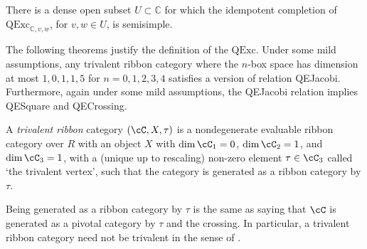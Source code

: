 \documentclass[12pt]{amsart}
\begin{document}
\begin{conjecture}
There is a dense open subset $U \subset \mathbb{C}$ for which the idempotent completion of $\mathrm{QExc}_{\mathbb{C},v,w}$, for $v,w \in U$, is semisimple.
\end{conjecture}



The following theorems justify the definition of the $\mathrm{QExc}$.  Under some mild assumptions, any trivalent ribbon category where the $n$-box space has dimension at most $1,0,1,1,5$ for $n=0,1,2,3,4$ satisfies a version of relation QEJacobi.  Furthermore, again under some mild assumptions, the QEJacobi relation implies QESquare and QECrossing.

\begin{definition}
A \emph{trivalent ribbon} category $(\cC, X, \tau)$ is a nondegenerate evaluable ribbon category over $R$ with 
an object $X$ with $\dim \cC_1 = 0$, $\dim{\cC_2} = 1$, and $\dim{\cC_3} = 1$, with a (unique up to rescaling) non-zero element $\tau \in \cC_3$ called `the trivalent vertex', such that the category is generated as a ribbon category by $\tau$.
\end{definition}

Being generated as a ribbon category by $\tau$ is the same as saying that $\cC$ is generated as a pivotal category by $\tau$ and the crossing.  In particular, a trivalent ribbon category need not be trivalent in the sense of \cite{???}.
\end{document}
